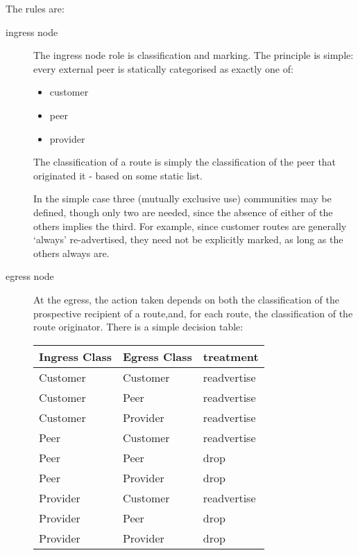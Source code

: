 The rules are:
\begin{description}
	\item[ingress node] The ingress node role is classification and marking.  The principle is simple: every external peer is statically categorised as exactly one of:
		\begin{itemize}
			\item customer
			\item peer
			\item provider
		\end{itemize}
		The classification of a route is simply the classification of the peer that originated it - based on some static list.

		In the simple case three (mutually exclusive use) communities may be defined, though only two are needed, since the absence of either of the others implies the third.  For example, since customer routes are generally `always' re-advertised, they need not be explicitly marked, as long as the others always are.
	\item[egress node] At the egress, the action taken depends on both the classification of the prospective recipient of a route,and, for each route, the classification of the route originator.  There is a simple decision table:

		\begin{tabular}{ |p{2.5cm}|p{2.5cm}||p{2.5cm}|  }
			\hline
			\hline
			Ingress Class & Egress Class & treatment   \\
			\hline
			Customer      & Customer     & readvertise \\
			Customer      & Peer         & readvertise \\
			Customer      & Provider     & readvertise \\
			\hline
			Peer          & Customer     & readvertise \\
			Peer          & Peer         & drop        \\
			Peer          & Provider     & drop        \\
			\hline
			Provider      & Customer     & readvertise \\
			Provider      & Peer         & drop        \\
			Provider      & Provider     & drop        \\

			\hline
		\end{tabular}

\end{description}

